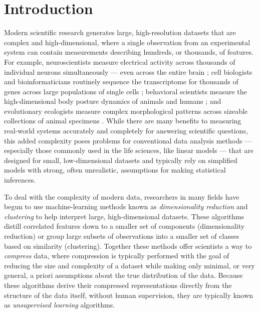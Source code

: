 \section{Introduction}
Modern scientific research generates large, high-resolution datasets that are complex and high-dimensional, where a single observation from an experimental system can contain measurements describing hundreds, or thousands, of features. For example, neuroscientists measure electrical activity across thousands of individual neurons simultaneously \citep{jun2017fully, stringer2019high, stringer2019spontaneous} --- even across the entire brain \citep{ahrens2012brain,ahrens2013whole}; cell biologists and bioinformaticians routinely sequence the transcriptome for thousands of genes across large populations of single cells \citep{samusik2016automated, la2018rna, becht2019dimensionality, linderman2019fast}; behavioral scientists measure the high-dimensional body posture dynamics of animals and humans \citep{stephens2008dimensionality, stephens2011emergence, kain2013leg, berman2014mapping, wiltschko2015mapping, klibaite2017unsupervised, Costa1501, cande2018optogenetic, mathis2018deeplabcut, chambers2019pose, gunel2019deepfly3d, graving2019deepposekit, klibaite2019interacting,
nath2019using,pereira2019fast, bala2020openmonkeystudio, ebbesen2020social, karashchuk2020anipose}; and evolutionary ecologists measure complex morphological patterns across sizeable collections of animal specimens \citep{cuthill2017biology, cuthill2019deep, ezray2019unsupervised, wham2019measuring, zhang2019shell}. While there are many benefits to measuring real-world systems accurately and completely for answering scientific questions, this added complexity poses problems for conventional data analysis methods --- especially those commonly used in the life sciences, like linear models \citep{bolker2009generalized} --- that are designed for small, low-dimensional datasets and typically rely on simplified models with strong, often unrealistic, assumptions for making statistical inferences.

To deal with the complexity of modern data, researchers in many fields have begun to use machine-learning methods known as \textit{dimensionality reduction} and \textit{clustering} to help interpret large, high-dimensional datasets. These algorithms distill correlated features down to a smaller set of components (dimensionality reduction) or group large subsets of observations into a smaller set of classes based on similarity (clustering). Together these methods offer scientists a way to \textit{compress} data, where compression is typically performed with the goal of reducing the size and complexity of a dataset while making only minimal, or very general, a priori assumptions about the true distribution of the data. Because these algorithms derive their compressed representations directly from the structure of the data itself, without human supervision, they are typically known as \textit{unsupervised learning} algorithms. 

